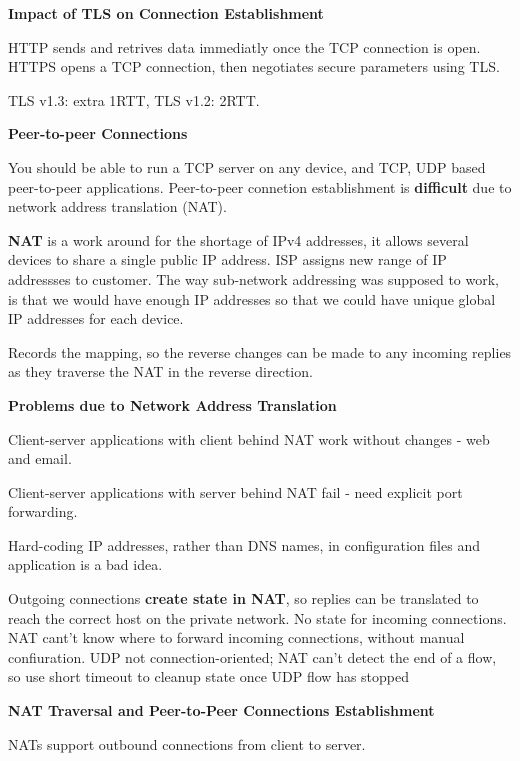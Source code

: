 \documentclass{article}
\begin{document}
\vspace{\baselineskip}
\textbf{Impact of TLS on Connection Establishment}

HTTP sends and retrives data immediatly once the TCP connection is open.
HTTPS opens a TCP connection, then negotiates secure parameters using TLS.\@

TLS v1.3: extra 1RTT, TLS v1.2: 2RTT.\@

\vspace{\baselineskip}
\textbf{Peer-to-peer Connections}

You should be able to run a TCP server on any device, and TCP, UDP based peer-to-peer applications.
Peer-to-peer connetion establishment is \textbf{difficult} due to network address translation (NAT).

\textbf{NAT} is a work around for the shortage of IPv4 addresses, it allows several devices to share a single public IP address.
ISP assigns new range of IP addressses to customer.
The way sub-network addressing was supposed to work, is that we would have enough IP addresses so that we could have
unique global IP addresses for each device.

Records the mapping, so the reverse changes can be made to any incoming replies as they traverse the NAT in the reverse direction.

\vspace{\baselineskip}
\textbf{Problems due to Network Address Translation}

Client-server applications with client behind NAT work without changes {-} web and email.

Client-server applications with server behind NAT fail {-} need explicit port forwarding.

Hard-coding IP addresses, rather than DNS names, in configuration files and application is a bad idea.

Outgoing connections \textbf{create state in NAT}, so replies can be translated to reach the correct host on the private network.
No state for incoming connections. NAT cant't know where to forward incoming connections, without manual confiuration.
UDP not connection-oriented; NAT can't detect the end of a flow, so use short timeout to cleanup state once UDP flow has stopped

\vspace{\baselineskip}
\textbf{NAT Traversal and Peer-to-Peer Connections Establishment}

NATs support outbound connections from client to server.
\end{document}
